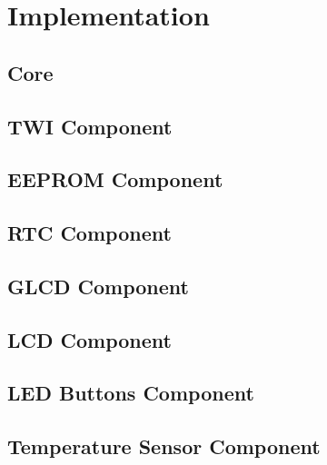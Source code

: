 
\chapter{Implementation} \label{chapter:implementation}

\section{Core}

\section{\acf{TWI} Component}

\section{\acf{EEPROM} Component}

\cite{microchip01}

\section{\acf{RTC} Component}

\cite{maxim01}

\section{\acf{GLCD} Component}

\cite{winstar01, samsung01, neotec01}

\section{\acf{LCD} Component}

\cite{hitachi01, samsung02, winstar02}

\section{\acf{LED} Buttons Component}

\section{Temperature Sensor Component}

\cite{maxim02}

